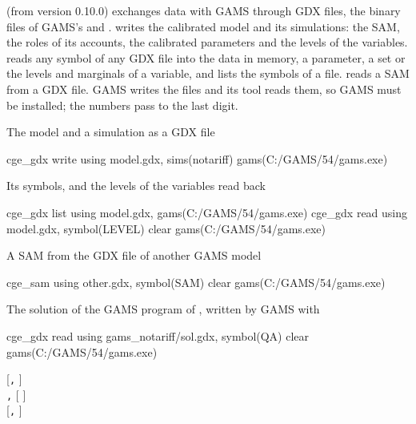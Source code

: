 

 (from version 0.10.0) exchanges data with GAMS through GDX
files, the binary files of GAMS's  and .
 writes the calibrated model and its simulations: the SAM,
the roles of its accounts, the calibrated parameters and the levels of the
variables.  reads any symbol of any GDX file into the data in
memory, a parameter, a set or the levels and marginals of a variable, and
 lists the symbols of a file.  reads a SAM
from a GDX file. GAMS writes the files and its tool  reads them,
so GAMS must be installed; the numbers pass to the last digit.


The model and a simulation as a GDX file
\begin{stcode}
cge_gdx write using model.gdx, sims(notariff) gams(C:/GAMS/54/gams.exe)
\end{stcode}
Its symbols, and the levels of the variables read back
\begin{stcode}
cge_gdx list using model.gdx, gams(C:/GAMS/54/gams.exe)
cge_gdx read using model.gdx, symbol(LEVEL) clear gams(C:/GAMS/54/gams.exe)
\end{stcode}
A SAM from the GDX file of another GAMS model
\begin{stcode}
cge_sam using other.gdx, symbol(SAM) clear gams(C:/GAMS/54/gams.exe)
\end{stcode}
The solution of the GAMS program of , written by GAMS with
\begin{stcode}
cge_gdx read using gams_notariff/sol.gdx, symbol(QA) clear gams(C:/GAMS/54/gams.exe)
\end{stcode}


\begin{stsyntax}
   [\texttt{,}    ]\\
   \texttt{,}   [ ]\\
   [\texttt{,}   ]
\end{stsyntax}

